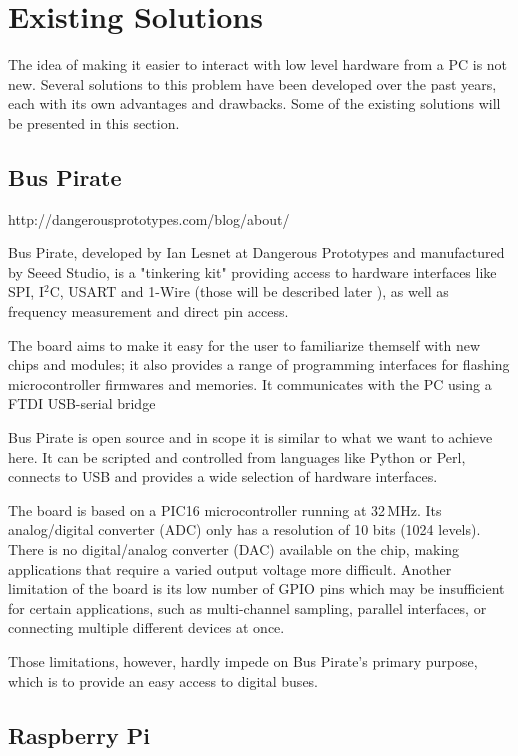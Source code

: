\chapter{Existing Solutions}

The idea of making it easier to interact with low level hardware from a PC is not new. Several solutions to this problem have been developed over the past years, each with its own advantages and drawbacks. Some of the existing solutions will be presented in this section.

\section{Bus Pirate}


http://dangerousprototypes.com/blog/about/

Bus Pirate, developed by Ian Lesnet at Dangerous Prototypes and manufactured by Seeed Studio, is a "tinkering kit" providing access to hardware interfaces like SPI, I$^2$C, USART and 1-Wire (those will be described later  ), as well as frequency measurement and direct pin access.

The board aims to make it easy for the user to familiarize themself with new chips and modules; it also provides a range of programming interfaces for flashing microcontroller firmwares and memories. It communicates with the PC using a FTDI USB-serial bridge

Bus Pirate is open source and in scope it is similar to what we want to achieve here. It can be scripted and controlled from languages like Python or Perl, connects to USB and provides a wide selection of hardware interfaces.

The board is based on a PIC16 microcontroller running at 32\,MHz. Its analog/digital converter (ADC) only has a resolution of 10 bits (1024 levels). There is no digital/analog converter (DAC) available on the chip, making applications that require a varied output voltage more difficult. Another limitation of the board is its low number of GPIO pins which may be insufficient for certain applications, such as multi-channel sampling, parallel interfaces, or connecting multiple different devices at once.

Those limitations, however, hardly impede on Bus Pirate's primary purpose, which is to provide an easy access to digital buses.

\section{Raspberry Pi}

